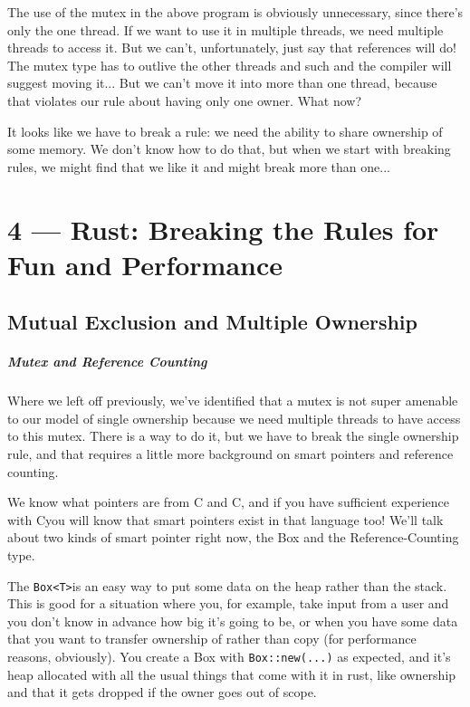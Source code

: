 \documentclass[a4paper]{report}
\newcommand{\CPP}{C\nolinebreak\hspace{-.05em}\raisebox{.4ex}{\tiny\bf +}\nolinebreak\hspace{-.10em}\raisebox{.4ex}{\tiny\bf +}}
\def\CPP{{C\nolinebreak[4]\hspace{-.05em}\raisebox{.4ex}{\tiny\bf ++}}}
\begin{document}
The use of the mutex in the above program is obviously unnecessary, since there's only the one thread. If we want to use it in multiple threads, we need multiple threads to access it. But we can't, unfortunately, just say that references will do! The mutex type has to outlive the other threads and such and the compiler will suggest moving it... But we can't move it into more than one thread, because that violates our rule about having only one owner. What now?

It looks like we have to break a rule: we need the ability to share ownership of some memory. We don't know how to do that, but when we start with breaking rules, we might find that we like it and might break more than one...









\chapter*{4 --- Rust: Breaking the Rules for Fun and Performance}


\section*{Mutual Exclusion and Multiple Ownership}

\paragraph{Mutex and Reference Counting}

Where we left off previously, we've identified that a mutex is not super amenable to our model of single ownership because we need multiple threads to have access to this mutex. There is a way to do it, but we have to break the single ownership rule, and that requires a little more background on smart pointers and reference counting.

We know what pointers are from C and \CPP, and if you have sufficient experience with \CPP you will know that smart pointers exist in that language too! We'll talk about two kinds of smart pointer right now, the Box and the Reference-Counting type.

The \texttt{Box<T>}is an easy way to put some data on the heap rather than the stack. This is good for a situation where you, for example, take input from a user and you don't know in advance how big it's going to be, or when you have some data that you want to transfer ownership of rather than copy (for performance reasons, obviously). You create a Box with \texttt{Box::new(...)} as expected, and it's heap allocated with all the usual things that come with it in rust, like ownership and that it gets dropped if the owner goes out of scope.
\end{document}
